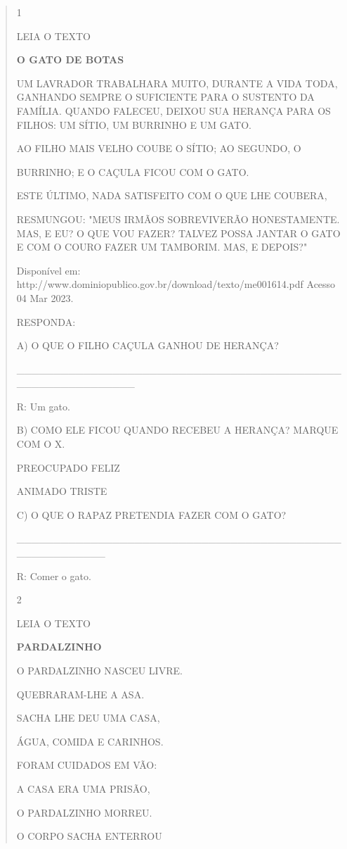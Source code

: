 {{{{\begin{verse}
{{\begin{escolha}
{{{{{

\num{1}

LEIA O TEXTO

\textbf{O GATO DE BOTAS}

UM LAVRADOR TRABALHARA MUITO, DURANTE A VIDA TODA, GANHANDO SEMPRE O
SUFICIENTE PARA O SUSTENTO DA FAMÍLIA. QUANDO FALECEU, DEIXOU SUA
HERANÇA PARA OS FILHOS: UM SÍTIO, UM BURRINHO E UM GATO.

AO FILHO MAIS VELHO COUBE O SÍTIO; AO SEGUNDO, O

BURRINHO; E O CAÇULA FICOU COM O GATO.

ESTE ÚLTIMO, NADA SATISFEITO COM O QUE LHE COUBERA,

RESMUNGOU: "MEUS IRMÃOS SOBREVIVERÃO HONESTAMENTE. MAS, E EU? O QUE VOU
FAZER? TALVEZ POSSA JANTAR O GATO E COM O COURO FAZER UM TAMBORIM. MAS,
E DEPOIS?"

Disponível em:
http://www.dominiopublico.gov.br/download/texto/me001614.pdf Acesso 04
Mar 2023.

RESPONDA:

A) O QUE O FILHO CAÇULA GANHOU DE HERANÇA?

\_\_\_\_\_\_\_\_\_\_\_\_\_\_\_\_\_\_\_\_\_\_\_\_\_\_\_\_\_\_\_\_\_\_\_\_\_\_\_\_\_\_\_\_\_\_\_\_\_\_\_\_\_\_\_\_\_\_\_\_

R: Um gato.

B) COMO ELE FICOU QUANDO RECEBEU A HERANÇA? MARQUE COM O X.

PREOCUPADO FELIZ

ANIMADO TRISTE

C) O QUE O RAPAZ PRETENDIA FAZER COM O GATO?

\_\_\_\_\_\_\_\_\_\_\_\_\_\_\_\_\_\_\_\_\_\_\_\_\_\_\_\_\_\_\_\_\_\_\_\_\_\_\_\_\_\_\_\_\_\_\_\_\_\_\_\_\_\_\_\_

R: Comer o gato.

\num{2}

LEIA O TEXTO

\textbf{PARDALZINHO}

O PARDALZINHO NASCEU LIVRE.

\protect\hypertarget{_Hlk128840862}{}{}QUEBRARAM-LHE A ASA.

SACHA LHE DEU UMA CASA,

ÁGUA, COMIDA E CARINHOS.

FORAM CUIDADOS EM VÃO:

A CASA ERA UMA PRISÃO,

O PARDALZINHO MORREU.

O CORPO SACHA ENTERROU

}}}}}
\end{escolha}}}
\end{verse}}}}}
